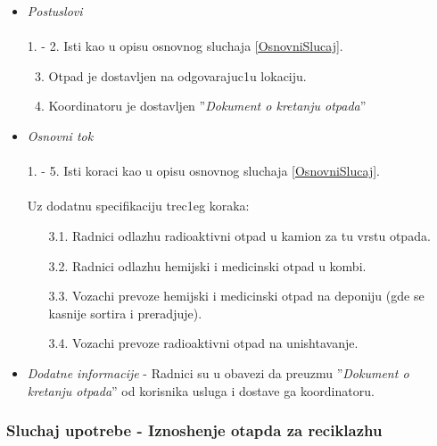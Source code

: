 \documentclass[10 pt]{article}
\begin{document}
\begin{itemize}
			\item\textit{Postuslovi}\\\\
				1. - 2. Isti kao u opisu osnovnog sluchaja \ref{OsnovniSlucaj}.
				\begin{enumerate}
					\setcounter{enumi}{2}
					\item Otpad je dostavljen na odgovarajuc1u lokaciju.
					\item Koordinatoru je dostavljen ''\textit{Dokument o kretanju otpada}''
				\end{enumerate}
			
			\item\textit{Osnovni tok}\\\\
				1. - 5. Isti koraci kao u opisu osnovnog sluchaja \ref{OsnovniSlucaj}.\\\\
				Uz dodatnu specifikaciju trec1eg koraka:
				\begin{enumerate}
					\item [3.1.] Radnici odlazhu radioaktivni otpad u kamion za tu vrstu otpada.
					\item [3.2.] Radnici odlazhu hemijski i medicinski otpad u kombi.
					\item [3.3.] Vozachi prevoze hemijski i medicinski otpad na deponiju (gde se kasnije sortira i preradjuje).
					\item [3.4.] Vozachi prevoze radioaktivni otpad na unishtavanje.
				\end{enumerate}
			
			\item\textit{Dodatne informacije} - Radnici su u obavezi da preuzmu ''\textit{Dokument o kretanju otpada}'' od korisnika usluga i dostave ga koordinatoru.
			
		\end{itemize}
	
	\subsubsection{Sluchaj upotrebe - Iznoshenje otapda za reciklazhu}
		
\end{document}
